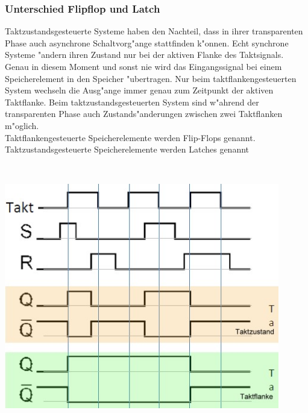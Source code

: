 	\subsubsection{Unterschied Flipflop und Latch}
		\begin{minipage}{12 cm}
			Taktzustandsgesteuerte Systeme haben den Nachteil, dass in ihrer transparenten Phase auch asynchrone Schaltvorg"ange stattfinden k"onnen. Echt synchrone Systeme "andern ihren Zustand nur bei der aktiven Flanke des Taktsignals. Genau in diesem Moment und sonst nie wird das Eingangssignal bei einem Speicherelement in den Speicher "ubertragen. Nur beim taktflankengesteuerten System wechseln die Ausg"ange immer genau zum Zeitpunkt der aktiven Taktflanke. Beim taktzustandsgesteuerten System sind w"ahrend der transparenten Phase auch Zustands"anderungen zwischen zwei Taktflanken m"oglich. \\
			Taktflankengesteuerte Speicherelemente werden Flip-Flops genannt. Taktzustandsgesteuerte Speicherelemente werden Latches genannt
		\end{minipage}
		\begin{minipage}{0.5 cm}
			\ 
		\end{minipage}
		\begin{minipage}{6 cm}
			\includegraphics[width=0.9\textwidth]{pics/flipflop_latch}
		\end{minipage}